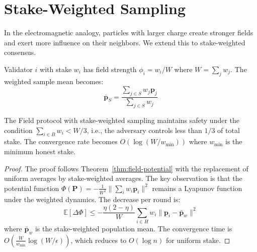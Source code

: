 \section{Stake-Weighted Sampling}

\label{sec:field-stake}

In the electromagnetic analogy, particles with larger charge create stronger fields
and exert more influence on their neighbors. We extend this to stake-weighted consensus.

\begin{definition}
Validator $i$ with stake $w_i$ has field strength $\phi_i = w_i / W$ where $W = \sum_j w_j$.
The weighted sample mean becomes:
\[
\bar{\mathbf{p}}_S = \frac{\sum_{j \in S} w_j \mathbf{p}_j}{\sum_{j \in S} w_j}
\]
\end{definition}

\begin{theorem}
\label{thm:field-stake}
The Field protocol with stake-weighted sampling maintains safety under the condition
$\sum_{i \in B} w_i < W/3$, i.e., the adversary controls less than $1/3$ of total stake.
The convergence rate becomes $O(\log(W/w_{\min}))$ where $w_{\min}$ is the minimum
honest stake.
\end{theorem}

\begin{proof}
The proof follows Theorem~\ref{thm:field-potential} with the replacement of uniform averages
by stake-weighted averages. The key observation is that the potential function
$\Phi(\mathbf{P}) = -\frac{1}{W^2}\|\sum_i w_i \mathbf{p}_i\|^2$ remains a Lyapunov
function under the weighted dynamics. The decrease per round is:
\[
\mathbb{E}[\Delta \Phi] \leq -\frac{\eta(2-\eta)}{W} \sum_{i \in H} w_i \|\mathbf{p}_i - \bar{\mathbf{p}}_w\|^2
\]
where $\bar{\mathbf{p}}_w$ is the stake-weighted population mean. The convergence time
is $O(\frac{W}{w_{\min}} \log(W/\epsilon))$, which reduces to $O(\log n)$ for uniform stake.
\end{proof}

